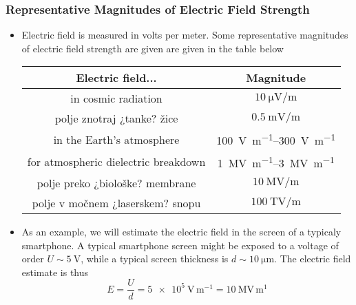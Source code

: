 \documentclass[11pt, a4paper]{article}
\begin{document}
\subsubsection{Representative Magnitudes of Electric Field Strength}
\begin{itemize}
    \item Electric field is measured in volts per meter. Some representative magnitudes of electric field strength are given are given in the table below
    \begin{center}
        \begin{tabular}{c|c}
            Electric field... & Magnitude \\
            \hline
            in cosmic radiation & $ \SI{10}{\micro \volt \per \meter} $\\
            polje znotraj ¿tanke? \v{z}ice & $ \SI{0.5}{\milli \volt \per \meter} $\\
            in the Earth's atmosphere & \SIrange{100}{300}{\volt \per \meter} \\
            for atmospheric dielectric breakdown & \SIrange{1}{3}{\mega \volt \per \meter}\\
            polje preko ¿biolo\v{s}ke? membrane & $ \SI{10}{\mega \volt \per \meter} $\\
            polje v mo\v{c}nem ¿laserskem? snopu & $ \SI{100}{\tera \volt \per \meter} $\\
        \end{tabular}
    \end{center}

    \item As an example, we will estimate the electric field in the screen of a typicaly smartphone. A typical smartphone screen might be exposed to a voltage of order $ U \sim \SI{5}{\volt} $, while a typical screen thickness is $ d \sim \SI{10}{\micro \meter} $. The electric field estimate is thus
    \begin{equation*}
        E = \frac{U}{d} = \SI{5e5}{\volt \, \meter^{-1}} = \SI{10}{\mega \volt \, \meter^{1}}
    \end{equation*}
    \end{itemize}
\end{document}
